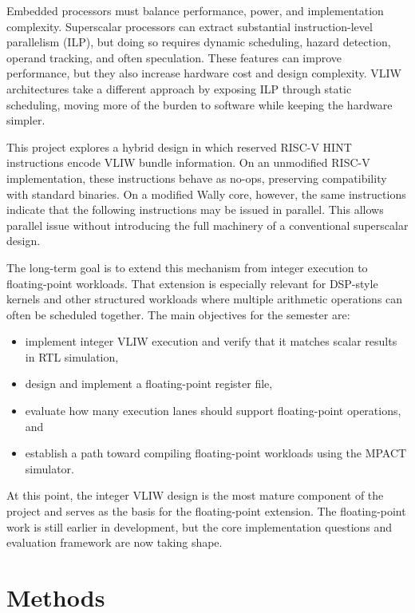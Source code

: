 \documentclass[conference,a4paper]{IEEEtran}
\begin{document}
Embedded processors must balance performance, power, and implementation complexity. Superscalar processors can extract substantial instruction-level parallelism (ILP), but doing so requires dynamic scheduling, hazard detection, operand tracking, and often speculation. These features can improve performance, but they also increase hardware cost and design complexity. VLIW architectures take a different approach by exposing ILP through static scheduling, moving more of the burden to software while keeping the hardware simpler.

This project explores a hybrid design in which reserved RISC-V HINT instructions encode VLIW bundle information. On an unmodified RISC-V implementation, these instructions behave as no-ops, preserving compatibility with standard binaries. On a modified Wally core, however, the same instructions indicate that the following instructions may be issued in parallel. This allows parallel issue without introducing the full machinery of a conventional superscalar design.

The long-term goal is to extend this mechanism from integer execution to floating-point workloads. That extension is especially relevant for DSP-style kernels and other structured workloads where multiple arithmetic operations can often be scheduled together. The main objectives for the semester are:

\begin{itemize}
    \item implement integer VLIW execution and verify that it matches scalar results in RTL simulation,
    \item design and implement a floating-point register file,
    \item evaluate how many execution lanes should support floating-point operations, and
    \item establish a path toward compiling floating-point workloads using the MPACT simulator.
\end{itemize}

At this point, the integer VLIW design is the most mature component of the project and serves as the basis for the floating-point extension. The floating-point work is still earlier in development, but the core implementation questions and evaluation framework are now taking shape.

\section{Methods}
\end{document}
